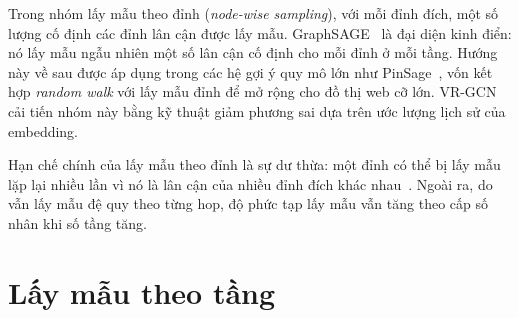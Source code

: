 Trong nhóm lấy mẫu theo đỉnh (\textit{node-wise sampling}), với mỗi đỉnh đích, một số lượng cố định các đỉnh lân cận được lấy mẫu. GraphSAGE~\cite{Hamilton2017} là đại diện kinh điển: nó lấy mẫu ngẫu nhiên một số lân cận cố định cho mỗi đỉnh ở mỗi tầng. Hướng này về sau được áp dụng trong các hệ gợi ý quy mô lớn như PinSage~\cite{Ying2018PinSage}, vốn kết hợp \textit{random walk} với lấy mẫu đỉnh để mở rộng cho đồ thị web cỡ lớn. VR-GCN~\cite{ChenZhu2018VRGCN} cải tiến nhóm này bằng kỹ thuật giảm phương sai dựa trên ước lượng lịch sử của embedding.

Hạn chế chính của lấy mẫu theo đỉnh là sự dư thừa: một đỉnh có thể bị lấy mẫu lặp lại nhiều lần vì nó là lân cận của nhiều đỉnh đích khác nhau~\cite{Younesian2023GRAPES}. Ngoài ra, do vẫn lấy mẫu đệ quy theo từng hop, độ phức tạp lấy mẫu vẫn tăng theo cấp số nhân khi số tầng tăng.

\section{Lấy mẫu theo tầng}


